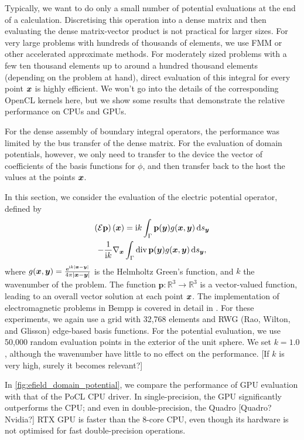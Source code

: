 Typically, we want to do only a small number of potential evaluations at the end of a calculation. Discretising this operation into a dense matrix and then evaluating the dense matrix-vector product is not practical for larger sizes. For very large problems with hundreds of thousands of elements, we use FMM or other accelerated approximate methods. For moderately sized problems with a few ten thousand elements up to around a hundred thousand elements (depending on the problem at hand), direct evaluation of this integral for every point $\boldsymbol{x}$ is highly efficient. We won't go into the details of the corresponding OpenCL kernels here, but we show some results that demonstrate the relative performance on CPUs and GPUs.

For the dense assembly of boundary integral operators, the performance was limited by the bus transfer of the dense matrix. For the evaluation of domain potentials, however, we only need to transfer to the device the vector of coefficients of the basis functions for $\phi$, and then transfer back to the host the values at the points $\boldsymbol{x}$.

In this section, we consider the evaluation of the electric potential operator, defined by
\begin{multline}
\left(\mathcal{E}\mathbf{p}\right)(\bx) = \ii k\int_{\Gamma}\mathbf{p}(\by)g(\bx, \by) \ds[\by]\\
-\frac{1}{\ii k}\nabla_{\bx}\int_{\Gamma}\operatorname{div}\mathbf{p}(\by)g(\bx, \by)\ds[\by],
\end{multline}
where $g(\boldsymbol{x}, \boldsymbol{y}) = \frac{\mathrm{e}^{\mathrm{i} k|\boldsymbol{x} - \boldsymbol{y}|}}{4\pi|\boldsymbol{x} - \boldsymbol{y}|}$ is the Helmholtz Green's function, and
$k$ the wavenumber of the problem.
The function $\mathbf{p}:\mathbb{R}^3\to\mathbb{R}^3$ is a vector-valued function, leading to an overall vector solution at each point $\boldsymbol{x}$. The implementation of electromagnetic problems in Bempp is covered in detail in \cite{bempp_maxwell}. For these experiments, we again use a grid with 32,768 elements and RWG (Rao, Wilton, and Glisson) edge-based basis functions. For the potential evaluation, we use 50,000 random evaluation points in the exterior of the unit sphere. We set $k=1.0$, although the wavenumber have little to no effect on the performance. {\color{red}[If $k$ is very high, surely it becomes relevant?]}

In \cref{fig:efield_domain_potential}, we compare the performance of GPU evaluation with that of the PoCL CPU driver. In single-precision, the GPU significantly outperforms the CPU; and even in double-precision, the Quadro {\color{red}[Quadro? Nvidia?]} RTX GPU is faster than the 8-core CPU, even though its hardware is not optimised for fast double-precision operations.

